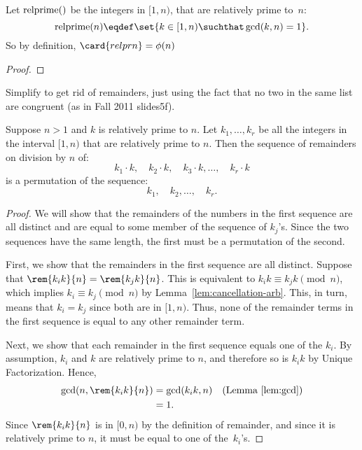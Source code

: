 Let $\relpr$ be the integers in $[1, n)$, that are relatively prime
  to~$n$:
\begin{equation}\label{def:relpr}
\relpr{n} \eqdef \set{k \in [1,n) \suchthat \gcd(k,n) = 1}.
\end{equation}
So by definition, $\card{relpr{n}} = \phi(n)$


\begin{proof}
\end{proof}

\begin{editingnotes}

Simplify to get rid of remainders, just using the fact that no two in
the same list are congruent (as in Fall 2011 slides5f).

\begin{lemma} \label{lem:permutes-arb}
Suppose $n>1$ and $k$ is relatively prime to $n$.
Let $k_1, \dots, k_r$ be all the integers in the interval
$[1,n)$ that are relatively prime to $n$.  Then the sequence of
  remainders on division by $n$ of:
\[
k_1 \cdot k,\quad
k_2 \cdot k,\quad
k_3 \cdot k, \dots,\quad
k_r \cdot k
\]
is a permutation of the sequence:
\[
k_1,\quad k_2, \dots,\quad k_r.
\]
\end{lemma}

\begin{proof}
We will show that the remainders of the numbers in the first sequence
are all distinct and are equal to some member of the sequence of
$k_j$'s.  Since the two sequences have the same length, the first must
be a permutation of the second.

First, we show that the remainders in the first sequence are all
distinct.  Suppose that $\rem{k_i k}{n} = \rem{k_j k}{n}$.  This is
equivalent to $k_i k \equiv k_j k \pmod{n}$, which implies $k_i \equiv
k_j \pmod{n}$ by Lemma~\ref{lem:cancellation-arb}.  This, in turn,
means that $k_i = k_j$ since both are in $[1,n)$.  Thus, none
of the remainder terms in the first sequence is equal to any other
remainder term.

Next, we show that each remainder in the first sequence equals one of
the $k_i$.  By assumption, $k_i$ and $k$ are relatively prime to $n$,
and therefore so is $k_ik$ by Unique Factorization.  Hence,
\begin{align*}
\gcd(n, \rem{k_i k}{n}) & = \gcd(k_i k, n)
            & \text{(Lemma~\ref{lem:gcd})}\\
      & = 1.
\end{align*}
Since $\rem{k_i k}{n}$ is in $[0, n)$ by the definition of remainder,
  and since it is relatively prime to $n$, it must be equal to one of
  the~$k_i$'s.
\end{proof}


\end{editingnotes}
